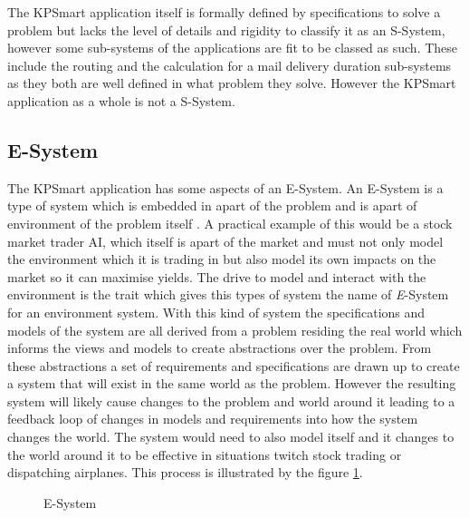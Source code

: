 \documentclass{style/CRPITStyle}
\renewcommand{\cite}{\citep}
\begin{document}
\vspace{.1in}

The KPSmart application itself is formally defined by specifications to solve a
problem but lacks the level of details and rigidity to classify it as an
S-System, however some sub-systems of the applications are fit to be classed as such.
These include the routing and the calculation for a mail delivery duration
sub-systems as they both are well defined in what problem they solve.
However the KPSmart application as a whole is not a S-System.

\subsection{E-System}

The KPSmart application has some aspects of an E-System.
An E-System is a type of system which is embedded in apart of the problem and is
apart of environment of the problem itself \cite{lehman:1980}. A practical example of this would be
a stock market trader AI, which itself is apart of the market and must not only
model the environment which it is trading in but also model its own impacts on the market
so it can maximise yields. The drive to model and interact with the environment
is the trait which gives this types of system the name of \emph{E}-System for
an environment system. With this kind of system the specifications and models
of the system are all derived from a problem residing the real world which
informs the views and models to create abstractions over the problem. From these
abstractions a set of requirements and specifications are drawn up to create a
system that will exist in the same world as the problem. However the resulting
system will likely cause changes to the problem and world around it leading to
a feedback loop of changes in models and requirements into how the system
changes the world. The system would need to also model itself and it changes to
the world around it to be effective in situations twitch stock trading or
dispatching airplanes. This process is illustrated by the figure \ref{e-system}.

\vspace{.1in}

\begin{figure}[htb]
\caption{\protect\label{e-system}  E-System }
\end{figure}
\end{document}
